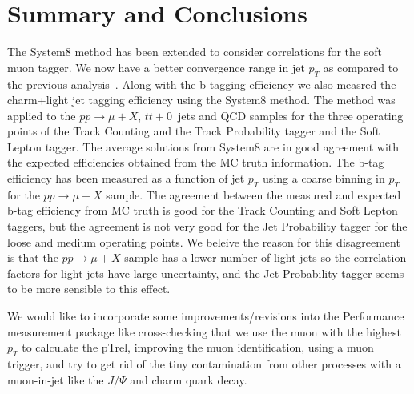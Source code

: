 \section{Summary and Conclusions}


 The System8 method has been extended to consider correlations for the soft
muon tagger. We now have a better convergence range in jet $p_T$ as compared 
to the previous analysis~\cite{ref:btag_oldnote}. Along with
the b-tagging efficiency we also measred the charm+light jet tagging 
efficiency using the System8 method. The method was applied to the 
$pp\rightarrow \mu +X$, $t\bar{t}+0$~jets and QCD samples for the three 
operating points of the Track Counting and the Track Probability tagger and the
Soft Lepton tagger. The average solutions from System8 are in good 
agreement with the expected efficiencies obtained from the MC truth information.
The b-tag efficiency has been measured as a function of jet $p_T$ using a coarse
binning in $p_T$ for the $pp\rightarrow \mu +X$ sample. The agreement between 
the measured and expected b-tag efficiency from MC truth is good for the Track 
Counting and Soft Lepton taggers, but the agreement is not very good for the 
Jet Probability tagger for the loose and medium operating points. We beleive
the reason for this disagreement is that the $pp\rightarrow \mu +X$ sample
 has a lower number of light jets so the correlation factors for 
light jets have large uncertainty, and the Jet Probability tagger seems to
be  more
sensible to this effect.

 We would like to incorporate some improvements/revisions into the Performance 
measurement package like cross-checking that we use the muon with the highest 
$p_T$ to calculate the pTrel, improving the muon identification, 
using a muon trigger, and try to get rid of the tiny contamination from other 
processes with a muon-in-jet like the $J/\Psi $ and charm quark decay.
